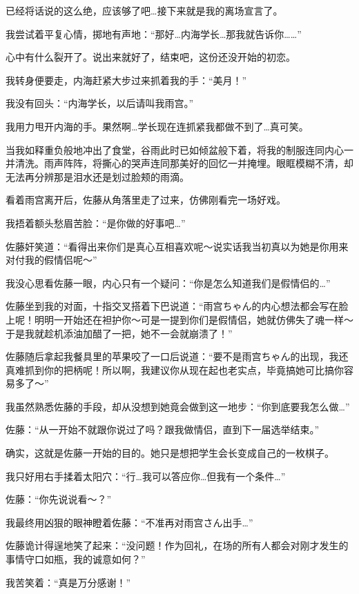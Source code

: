 已经将话说的这么绝，应该够了吧…接下来就是我的离场宣言了。

我尝试着平复心情，掷地有声地：“那好…内海学长…那我就告诉你……”


心中有什么裂开了。说出来就好了，结束吧，这份还没开始的初恋。

我转身便要走，内海赶紧大步过来抓着我的手：“美月！”

我没有回头：“内海学长，以后请叫我雨宫。”

我用力甩开内海的手。果然啊…学长现在连抓紧我都做不到了…真可笑。

当我如释重负般地冲出了食堂，谷雨此时已如倾盆般下着，将我的制服连同内心一并清洗。雨声阵阵，将撕心的哭声连同那美好的回忆一并掩埋。眼眶模糊不清，却无法再分辨那是泪水还是划过脸颊的雨滴。

\cutlinea

\newday{\hate\rain\rainy}

看着雨宫离开后，佐藤从角落里走了过来，仿佛刚看完一场好戏。

我捂着额头愁眉苦脸：“是你做的好事吧…”

佐藤奸笑道：“看得出来你们是真心互相喜欢呢～说实话我当初真以为她是你用来对付我的假情侣呢～”

我没心思看佐藤一眼，内心只有一个疑问：“你是怎么知道我们是假情侣的…”

佐藤坐到我的对面，十指交叉搭着下巴说道：“雨宫ちゃん的内心想法都会写在脸上呢！明明一开始还在袒护你～可是一提到你们是假情侣，她就仿佛失了魂一样～于是我就趁机添油加醋了一把，她不一会就崩溃了！”

佐藤随后拿起我餐具里的苹果咬了一口后说道：“要不是雨宫ちゃん的出现，我还真难抓到你的把柄呢！所以啊，我建议你从现在起也老实点，毕竟搞她可比搞你容易多了～”

我虽然熟悉佐藤的手段，却从没想到她竟会做到这一地步：“你到底要我怎么做…”

佐藤：“从一开始不就跟你说过了吗？跟我做情侣，直到下一届选举结束。”

确实，这就是佐藤一开始的目的。她只是想把学生会长变成自己的一枚棋子。

我只好用右手揉着太阳穴：“行…我可以答应你…但我有一个条件…”

佐藤：“你先说说看～？”

我最终用凶狠的眼神瞪着佐藤：“不准再对雨宫さん出手…”

佐藤诡计得逞地笑了起来：“没问题！作为回礼，在场的所有人都会对刚才发生的事情守口如瓶，我的诚意如何？”

我苦笑着：“真是万分感谢！”

